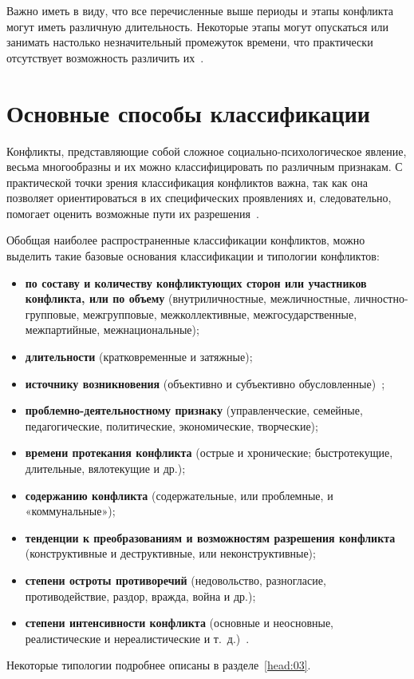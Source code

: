 
Важно иметь в виду, что все перечисленные выше периоды и этапы конфликта могут
иметь различную длительность. Некоторые этапы могут опускаться или занимать
настолько незначительный промежуток времени, что практически отсутствует
возможность различить их~\cite{book01}.

\section{Основные способы классификации}

Конфликты, представляющие собой сложное социально-психологическое явление,
весьма многообразны и их можно классифицировать по различным признакам. С
практической точки зрения классификация конфликтов важна, так как она позволяет
ориентироваться в их специфических проявлениях и, следовательно, помогает
оценить возможные пути их разрешения~\cite{book03}.

Обобщая наиболее распространенные классификации конфликтов, можно выделить такие
базовые основания классификации и типологии конфликтов:

\begin{itemize}
    \item \textbf{по составу и количеству конфликтующих сторон или участников
        конфликта, или по объему} (внутриличностные, межличностные,
        личностно-групповые, межгрупповые, межколлективные, межгосударственные,
        межпартийные, межнациональные);
    \item \textbf{длительности} (кратковременные и затяжные);
    \item \textbf{источнику возникновения} (объективно и субъективно
        обусловленные)~\cite{book08};
    \item \textbf{проблемно-деятельностному признаку} (управленческие, семейные,
        педагогические, политические, экономические, творческие);
    \item \textbf{времени протекания конфликта} (острые и хронические;
        быстротекущие, длительные, вялотекущие и др.);
    \item \textbf{содержанию конфликта} (содержательные, или проблемные, и
        «коммунальные»);
    \item \textbf{тенденции к преобразованиям и возможностям разрешения
        конфликта} (конструктивные и деструктивные, или неконструктивные);
    \item \textbf{степени остроты противоречий} (недовольство, разногласие,
        противодействие, раздор, вражда, война и др.);
    \item \textbf{степени интенсивности конфликта} (основные и неосновные,
        реалистические и нереалистические и т.~д.)~\cite{book02}.
\end{itemize}

Некоторые типологии подробнее описаны в разделе~\ref{head:03}.
